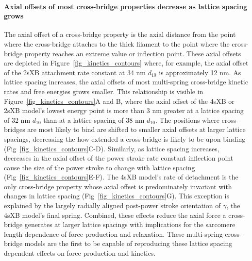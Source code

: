 \documentclass[10pt]{article}
\begin{document}
\paragraph{Axial offsets of most cross-bridge properties decrease as lattice spacing grows} %
The axial offset of a cross-bridge property is the axial distance from the point where the cross-bridge attaches to the thick filament to the point where the cross-bridge property reaches an extreme value or inflection point. 
These axial offsets are depicted in Figure~\ref{fig_kinetics_contours} where, for example, the axial offset of the 2sXB attachment rate constant at 34 nm $d_{10}$ is approximately 12 nm. 
As lattice spacing increases, the axial offsets of most multi-spring cross-bridge kinetic rates and free energies grows smaller.
This relationship is visible in Figure~\ref{fig_kinetics_contours}A and B, where the axial offset of the 4sXB or 2sXB model's lowest energy point is more than 3 nm greater at a lattice spacing of 32 nm $d_{10}$ than at a lattice spacing of 38 nm $d_{10}$. 
The positions where cross-bridges are most likely to bind are shifted to smaller axial offsets at larger lattice spacings, decreasing the how extended a cross-bridge is likely to be upon binding (Fig~\ref{fig_kinetics_contours}C-D). 
Similarly, as lattice spacing increases, decreases in the axial offset of the power stroke rate constant inflection point cause the size of the power stroke to change with lattice spacing (Fig~\ref{fig_kinetics_contours}E-F).
The 4sXB model's rate of detachment is the only cross-bridge property whose axial offset is predominately invariant with changes in lattice spacing (Fig~\ref{fig_kinetics_contours}G). 
This exception is explained by the largely radially aligned post-power stroke orientation of $\gamma$, the 4sXB model's final spring. 
Combined, these effects reduce the axial force a cross-bridge generates at larger lattice spacings with implications for the sarcomere length dependence of force production and relaxation. 
These multi-spring cross-bridge models are the first to be capable of reproducing these lattice spacing dependent effects on force production and kinetics.
\end{document}
